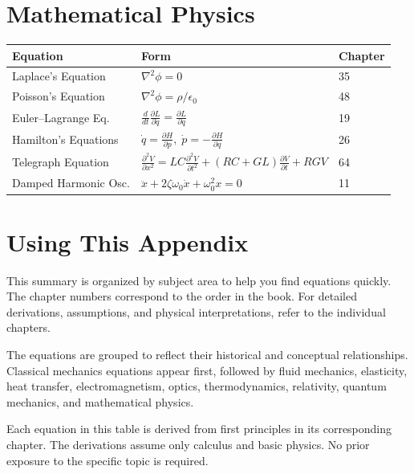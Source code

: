 \section*{Mathematical Physics}

\begin{center}
\begin{tabular}{lll}
\hline
\textbf{Equation} & \textbf{Form} & \textbf{Chapter} \\
\hline
Laplace's Equation & $\nabla^2 \phi = 0$ & 35 \\
Poisson's Equation & $\nabla^2 \phi = \rho/\epsilon_0$ & 48 \\
Euler--Lagrange Eq. & $\frac{d}{dt}\frac{\partial L}{\partial \dot{q}} = \frac{\partial L}{\partial q}$ & 19 \\
Hamilton's Equations & $\dot{q} = \frac{\partial H}{\partial p}, \; \dot{p} = -\frac{\partial H}{\partial q}$ & 26 \\
Telegraph Equation & $\frac{\partial^2 V}{\partial x^2} = LC\frac{\partial^2 V}{\partial t^2} + (RC+GL)\frac{\partial V}{\partial t} + RG V$ & 64 \\
Damped Harmonic Osc. & $\ddot{x} + 2\zeta\omega_0\dot{x} + \omega_0^2 x = 0$ & 11 \\
\hline
\end{tabular}
\end{center}

\section*{Using This Appendix}

This summary is organized by subject area to help you find equations quickly. The chapter numbers correspond to the order in the book. For detailed derivations, assumptions, and physical interpretations, refer to the individual chapters.

The equations are grouped to reflect their historical and conceptual relationships. Classical mechanics equations appear first, followed by fluid mechanics, elasticity, heat transfer, electromagnetism, optics, thermodynamics, relativity, quantum mechanics, and mathematical physics.

Each equation in this table is derived from first principles in its corresponding chapter. The derivations assume only calculus and basic physics. No prior exposure to the specific topic is required.
